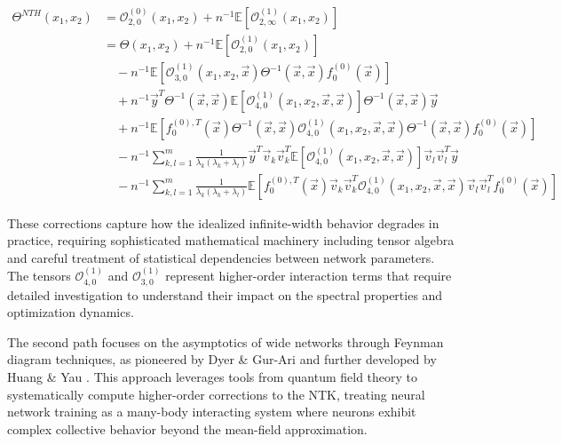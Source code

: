 \documentclass{article}
\begin{document}
\begin{align}
\Theta^{NTH}(x_1, x_2) &= \mathcal{O}^{(0)}_{2,0}(x_1, x_2) + n^{-1}\mathbb{E}[\mathcal{O}^{(1)}_{2,\infty}(x_1, x_2)] \nonumber \\
&= \Theta(x_1, x_2) + n^{-1}\mathbb{E}\left[\mathcal{O}^{(1)}_{2,0}(x_1, x_2)\right] \nonumber \\
&\quad - n^{-1}\mathbb{E}\left[\mathcal{O}^{(1)}_{3,0}(x_1, x_2, \vec{x})\Theta^{-1}(\vec{x}, \vec{x})f^{(0)}_0(\vec{x})\right] \nonumber \\
&\quad + n^{-1}\vec{y}^T \Theta^{-1}(\vec{x}, \vec{x})\mathbb{E}\left[\mathcal{O}^{(1)}_{4,0}(x_1, x_2, \vec{x}, \vec{x})\right] \Theta^{-1}(\vec{x}, \vec{x})\vec{y} \nonumber \\
&\quad + n^{-1}\mathbb{E}\left[f^{(0),T}_0(\vec{x})\Theta^{-1}(\vec{x}, \vec{x})\mathcal{O}^{(1)}_{4,0}(x_1, x_2, \vec{x}, \vec{x})\Theta^{-1}(\vec{x}, \vec{x})f^{(0)}_0(\vec{x})\right] \nonumber \\
&\quad - n^{-1}\sum_{k,l=1}^m \frac{1}{\lambda_k(\lambda_k + \lambda_l)} \vec{y}^T \vec{v}_k\vec{v}^T_k \mathbb{E}\left[\mathcal{O}^{(1)}_{4,0}(x_1, x_2, \vec{x}, \vec{x})\right] \vec{v}_l\vec{v}^T_l \vec{y} \nonumber \\
&\quad - n^{-1}\sum_{k,l=1}^m \frac{1}{\lambda_k(\lambda_k + \lambda_l)} \mathbb{E}\left[f^{(0),T}_0(\vec{x})\vec{v}_k\vec{v}^T_k \mathcal{O}^{(1)}_{4,0}(x_1, x_2, \vec{x}, \vec{x})\vec{v}_l\vec{v}^T_l f^{(0)}_0(\vec{x})\right]
\end{align}

These corrections capture how the idealized infinite-width behavior degrades in practice, requiring sophisticated mathematical machinery including tensor algebra and careful treatment of statistical dependencies between network parameters. The tensors $\mathcal{O}^{(1)}_{4,0}$ and $\mathcal{O}^{(1)}_{3,0}$ represent higher-order interaction terms that require detailed investigation to understand their impact on the spectral properties and optimization dynamics.

The second path focuses on the asymptotics of wide networks through Feynman diagram techniques, as pioneered by Dyer & Gur-Ari \cite{dyer2019asymptotics} and further developed by Huang & Yau \cite{huang2019dynamics}. This approach leverages tools from quantum field theory to systematically compute higher-order corrections to the NTK, treating neural network training as a many-body interacting system where neurons exhibit complex collective behavior beyond the mean-field approximation.
\end{document}
